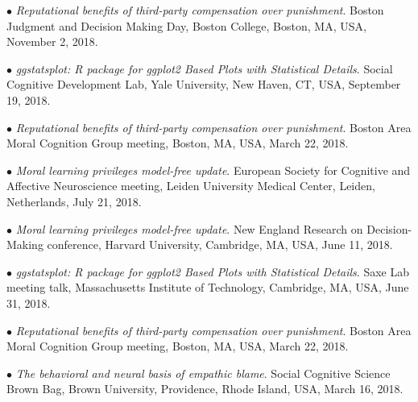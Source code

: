 \documentclass[10pt]{article}
\begin{document}
	$\bullet$ \textit{Reputational benefits of third-party compensation over punishment}. Boston Judgment and Decision Making \hspace*{0.1in}Day, Boston College, Boston, MA, USA, November 2, 2018.\\
	\miniskip	

	$\bullet$ \textit{ggstatsplot: R package for ggplot2 Based Plots with Statistical Details}. Social Cognitive Development Lab, \hspace*{0.1in}Yale University, New Haven, CT, USA, September 19, 2018.\\
	\miniskip

	$\bullet$ \textit{Reputational benefits of third-party compensation over punishment}. Boston Area Moral Cognition Group \hspace*{0.1in}meeting, Boston, MA, USA, March 22, 2018.\\
	\miniskip

	$\bullet$ \textit{Moral learning privileges model-free update}. European Society for Cognitive and Affective Neuroscience \hspace*{0.1in}meeting, Leiden University Medical Center, Leiden, Netherlands, July 21, 2018.\\
	\miniskip
	
	$\bullet$ \textit{Moral learning privileges model-free update}. New England Research on Decision-Making conference, Harvard \hspace*{0.1in}University, Cambridge, MA, USA, June 11, 2018.\\
	\miniskip

	$\bullet$ \textit{ggstatsplot: R package for ggplot2 Based Plots with Statistical Details}. Saxe Lab meeting talk, Massachusetts \hspace*{0.1in}Institute of Technology, Cambridge, MA, USA, June 31, 2018.\\
	\miniskip
		
	$\bullet$ \textit{Reputational benefits of third-party compensation over punishment}. Boston Area Moral Cognition Group \hspace*{0.1in}meeting, Boston, MA, USA, March 22, 2018.\\
	\miniskip

	$\bullet$ \textit{The behavioral and neural basis of empathic blame}. Social Cognitive Science Brown Bag, Brown University, \hspace*{0.1in}Providence, Rhode Island, USA, March 16, 2018.\\
	\miniskip	
	
\end{document}
